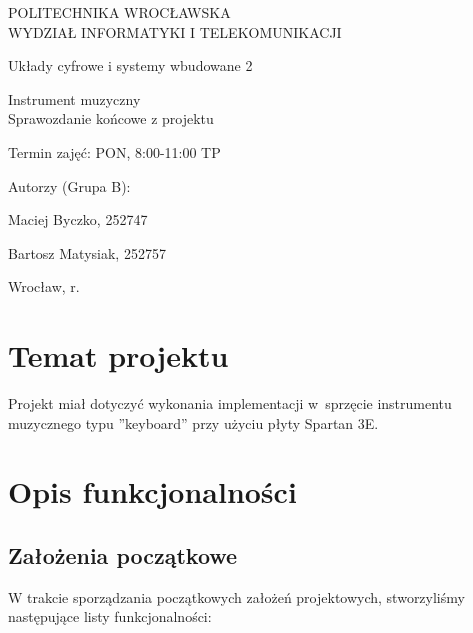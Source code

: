 \documentclass{article}
\begin{document}
\begin{titlepage}
    \begin{center}\LARGE POLITECHNIKA WROCŁAWSKA \\ WYDZIAŁ INFORMATYKI I TELEKOMUNIKACJI \end{center}
    \vspace{57pt}
    \begin{center} \Huge Układy cyfrowe i systemy wbudowane 2 \end{center}
    \vspace{35pt}
    \begin{center} \LARGE Instrument muzyczny \\ Sprawozdanie końcowe z projektu \end{center}
    \vspace{40pt}
    \begin{flushleft}\Large Termin zajęć: PON, 8:00-11:00 TP   \end{flushleft}
    \vspace{15pt}
    \begin{paracol}{2}
        \raggedright{\Large Autorzy (Grupa B):} \switchcolumn {} \switchcolumn
        \raggedright{\Large Maciej Byczko, 252747} \switchcolumn {} \switchcolumn
        \raggedright{\Large Bartosz Matysiak, 252757} 
    \end{paracol}
    \vspace{150pt}
    \begin{center}Wrocław, \the\year{}r.\end{center}
\end{titlepage}

\tableofcontents

\newpage

\section{Temat projektu}

Projekt miał dotyczyć wykonania implementacji w~sprzęcie instrumentu muzycznego typu ''keyboard'' przy użyciu płyty Spartan 3E.

\section{Opis funkcjonalności} %

\subsection{Założenia początkowe}
W trakcie sporządzania początkowych założeń projektowych, stworzyliśmy następujące listy funkcjonalności:
\end{document}
